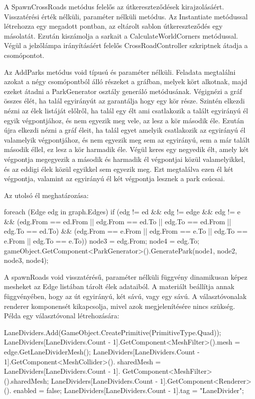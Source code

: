 A SpawnCrossRoads metódus felelős az útkereszteződések kirajzolásáért. Visszatérési érték nélküli, paraméter nélküli metódus. Az Instantiate metódussal létrehozza egy megadott pontban, az eltárolt sablon útkereszteződés egy másolatát. Ezután kiszámolja a sarkait a CalculateWorldCorners metódussal. Végül a jelzőlámpa irányításáért felelős CrossRoadController szkriptnek átadja a csomópontot.

Az AddParks metódus void típusú és paraméter nélküli. Feladata megtalálni azokat a négy csomópontból álló részeket a gráfban, melyek kört alkotnak, majd ezeket átadni a ParkGenerator osztály generáló metódusának. Végignézi a gráf összes élét, ha talál egyirányút az garantálja hogy egy kör része. Szintén elkezdi nézni az élek listáját előlről, ha talál egy élt ami csatlakozik a talált egyirányú él egyik végpontjához, és nem egyezik meg vele, az lesz a kör második éle. Ezután újra elkezdi nézni a gráf éleit, ha talál egyet amelyik csatlakozik az egyirányú él valamelyik végpontjához, és nem egyezik meg sem az egyirányú, sem a már talált második éllel, ez lesz a kör harmadik éle. Végül keres egy negyedik élt, amely két végpontja megegyezik a második és harmadik él végpontjai közül valamelyikkel, és az eddigi élek közül egyikkel sem egyezik meg. Ezt megtalálva ezen él két végpontja, valamint az egyirányú él két végpontja lesznek a park csúcsai.

Az utolsó él meghatározása:
\begin{cpp}
foreach (Edge edg in graph.Edges)
{
    if (edg != ed && edg != edge && edg != e && (edg.From == ed.From || 
    edg.From == ed.To || edg.To == ed.From || edg.To == ed.To) && 
    (edg.From == e.From || edg.From == e.To || edg.To == e.From || 
    edg.To == e.To))
    {
        node3 = edg.From;
        node4 = edg.To;
        gameObject.GetComponent<ParkGenerator>().GeneratePark(node1, 
        node2, node3, node4);
    }
}
\end{cpp}

A spawnRoads void visszatérésű, paraméter nélküli függvény dinamikusan képez mesheket az Edge listában tárolt élek adataiból. A materiált beállítja annak függvényében, hogy az út egyirányú, két sávú, vagy egy sávú. A választóvonalak renderer komponensét kikapcsolja, mivel azok megjelenítésére nincs szükség. 
Példa egy választóvonal létrehozására:
\begin{cpp}
LaneDividers.Add(GameObject.CreatePrimitive(PrimitiveType.Quad));
LaneDividers[LaneDividers.Count - 1].GetComponent<MeshFilter>().mesh = 
edge.GetLaneDividerMesh();
LaneDividers[LaneDividers.Count - 1].GetComponent<MeshCollider>().
sharedMesh = LaneDividers[LaneDividers.Count - 1].
GetComponent<MeshFilter>().sharedMesh;
LaneDividers[LaneDividers.Count - 1].GetComponent<Renderer>().
enabled = false;
LaneDividers[LaneDividers.Count - 1].tag = "LaneDivider";
\end{cpp}

